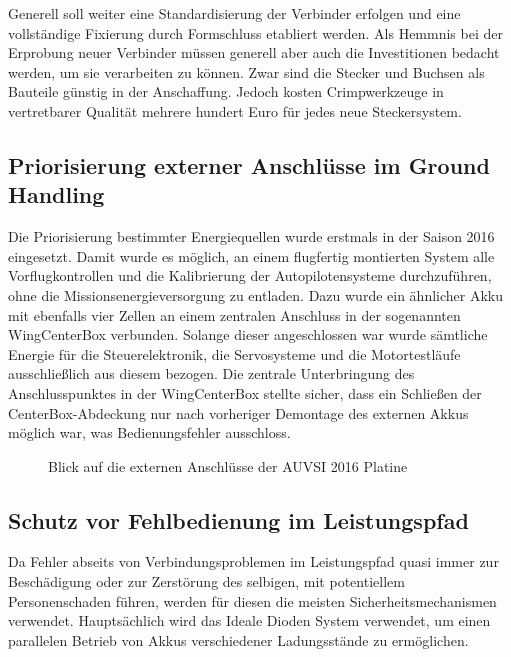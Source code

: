 Generell soll weiter eine Standardisierung der Verbinder erfolgen und eine vollständige Fixierung durch Formschluss etabliert werden.
Als Hemmnis bei der Erprobung neuer Verbinder müssen generell aber auch die Investitionen bedacht werden, um sie verarbeiten zu können. Zwar sind die Stecker und Buchsen als Bauteile günstig in der Anschaffung. Jedoch kosten Crimpwerkzeuge in vertretbarer Qualität  mehrere hundert Euro für jedes neue Steckersystem.





\subsection{Priorisierung externer Anschlüsse im Ground Handling}

Die Priorisierung bestimmter Energiequellen wurde erstmals in der Saison 2016 eingesetzt. Damit wurde es möglich, an einem flugfertig montierten System alle Vorflugkontrollen und die Kalibrierung der Autopilotensysteme durchzuführen, ohne die Missionsenergieversorgung zu entladen. Dazu wurde ein ähnlicher Akku mit ebenfalls vier Zellen an einem zentralen Anschluss in der sogenannten WingCenterBox verbunden. Solange dieser angeschlossen war wurde sämtliche Energie für die Steuerelektronik, die Servosysteme und die Motortestläufe ausschließlich aus diesem bezogen. Die zentrale Unterbringung des Anschlusspunktes in der WingCenterBox stellte sicher, dass ein Schließen der CenterBox-Abdeckung nur nach vorheriger Demontage des externen Akkus möglich war, was Bedienungsfehler ausschloss.

\begin{figure}[H]
\centering
{}
\caption{Blick auf die externen Anschlüsse der AUVSI 2016 Platine} 
\label{fig:Blick auf die Externen Anschlüsse der AUVSI 2016 Platine}
\end{figure}


\subsection{Schutz vor Fehlbedienung im Leistungspfad}

Da Fehler abseits von Verbindungsproblemen im Leistungspfad quasi immer zur Beschädigung oder zur Zerstörung des selbigen, mit potentiellem Personenschaden führen, werden für diesen die meisten Sicherheitsmechanismen verwendet.
Hauptsächlich wird das Ideale Dioden System verwendet, um einen parallelen Betrieb von Akkus verschiedener Ladungsstände zu ermöglichen.

